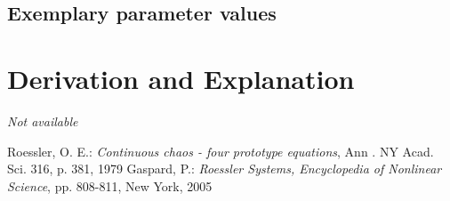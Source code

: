 \documentclass[10pt,a4paper]{article}
\begin{document}
	\subsection{Exemplary parameter values}
	

	
	\section{Derivation and Explanation} %
	
	\textit{Not available}
	
	
	\begin{thebibliography}{10}		
		Roessler, O. E.: 
		\textit{Continuous chaos - four prototype equations}, Ann . NY Acad. Sci. 316, p. 381, 1979
		Gaspard, P.: 
		\textit{Roessler Systems, Encyclopedia of Nonlinear Science}, pp. 808-811, New York, 2005
	\end{thebibliography}
\end{document}
